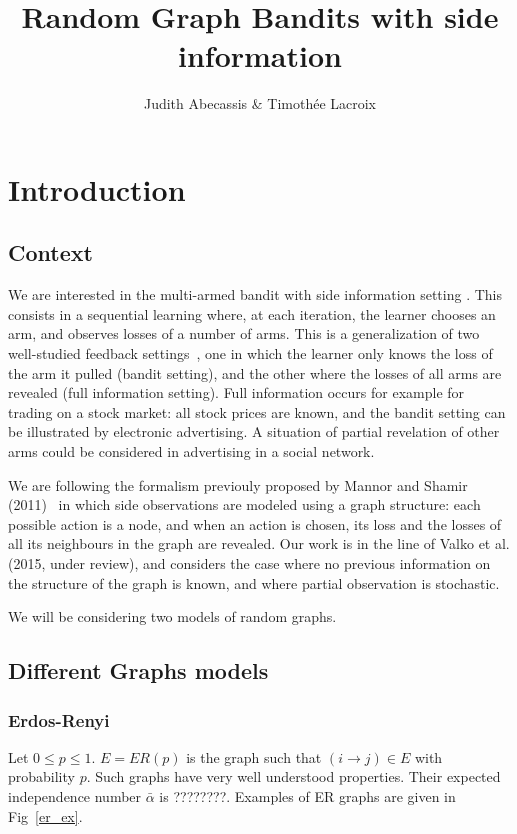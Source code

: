 \documentclass[10pt,a4paper]{scrartcl}
\author{Judith Abecassis \& Timothée Lacroix}
\title{Random Graph Bandits with side information}
\begin{document}
\maketitle

\section{Introduction}
\subsection{Context}
We are interested in the multi-armed bandit with side information setting \cite{mannor2011bandits, alon2013bandits, kocak2014efficient}. This consists in a sequential learning where, at each iteration, the learner chooses an arm, and observes losses of a number of arms. This is a generalization of two well-studied feedback settings~\cite{cesa2006prediction}, one in which the learner only knows the loss of the arm it pulled (bandit setting), and the other where the losses of all arms are revealed (full information setting). Full information occurs for example for trading on a stock market: all stock prices are known, and the bandit setting can be illustrated by electronic advertising. A situation of partial revelation of other arms could be considered in advertising in a social network.

We are following the formalism previouly proposed by Mannor and Shamir (2011)~\cite{mannor2011bandits} in which side observations are modeled using a graph structure: each possible action is a node, and when an action is chosen, its loss and the losses of all its neighbours in the graph are revealed. Our work is in the line of Valko et al. (2015, under review), and considers the case where no previous information on the structure of the graph is known, and where partial observation is stochastic. 

We will be considering two models of random graphs.

\subsection{Different Graphs models}

\subsubsection{Erdos-Renyi}
Let $0\leq p \leq 1$. $E=ER(p)$ is the graph such that $(i \rightarrow j) \in E$ with probability $p$. Such graphs have very well understood properties. Their expected independence number $\bar{\alpha}$ is ????????.
Examples of ER graphs are given in Fig~\ref{er_ex}.
\end{document}
